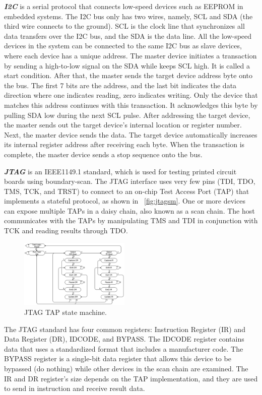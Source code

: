 \textbf{\textit{I2C}} is a serial protocol that connects low-speed devices such as EEPROM in embedded systems. The I2C bus only has two wires, namely, SCL and SDA (the third wire connects to the ground). SCL is the clock line that synchronizes all data transfers over the I2C bus, and the SDA is the data line. All the low-speed devices in the system can be connected to the same I2C bus as slave devices, where each device has a unique address. The master device initiates a transaction by sending a high-to-low signal on the SDA while keeps SCL high. It is called a start condition. After that, the master sends the target device address byte onto the bus. The first 7 bits are the address, and the last bit indicates the data direction where one indicates reading, zero indicates writing. Only the device that matches this address continues with this transaction. It acknowledges this byte by pulling SDA low during the next SCL pulse. After addressing the target device, the master sends out the target device's internal location or register number. Next, the master device sends the data. The target device automatically increases its internal register address after receiving each byte. When the transaction is complete, the master device sends a stop sequence onto the bus.


\textbf{\textit{JTAG}} is an IEEE1149.1 standard, which is used for testing printed circuit boards using boundary-scan. The JTAG interface uses very few pins (TDI, TDO, TMS, TCK, and TRST) to connect to an on-chip Test Access Port (TAP) that implements a stateful protocol, as shown in ~\autoref{fig:jtagsm}.  One or more devices can expose multiple TAPs in a daisy chain, also known as a scan chain. The host communicates with the TAPs by manipulating TMS and TDI in conjunction with TCK and reading results through TDO.


\begin{figure}[ht]
	\includegraphics[width=0.47\textwidth]{figures/jtagsm}
	\centering
	\caption{JTAG TAP state machine.}
	\label{fig:jtagsm}
\end{figure}


The JTAG standard has four common registers: Instruction Register (IR) and Data Register (DR),  IDCODE, and BYPASS. The IDCODE register contains data that uses a standardized format that includes a manufacturer code. The BYPASS register is a single-bit data register that allows this device to be bypassed (do nothing) while other devices in the scan chain are examined. The IR and DR register's size depends on the TAP implementation, and they are used to send in instruction and receive result data.

